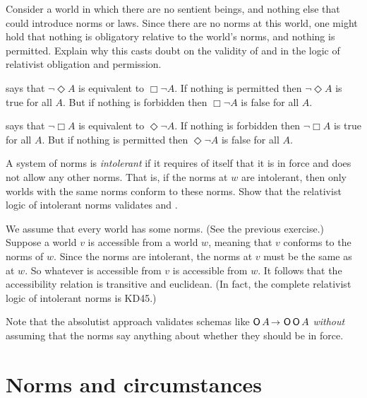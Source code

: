 \begin{exercise}
  Consider a world in which there are no sentient beings, and nothing else that
  could introduce norms or laws. Since there are no norms at this world, one
  might hold that nothing is obligatory relative to the world's norms, and
  nothing is permitted. Explain why this casts doubt on the validity of
   and  in the logic of relativist obligation and
  permission.
\end{exercise}
\begin{solution}
   says that $\neg \Diamond A$ is equivalent to $\Box \neg A$. If
  nothing is permitted then $\neg \Diamond A$ is true for all $A$. But if
  nothing is forbidden then $\Box \neg A$ is false for all $A$.

   says that $\neg \Box A$ is equivalent to $\Diamond \neg A$. If
  nothing is forbidden then $\neg \Box A$ is true for all $A$. But if
  nothing is permitted then $\Diamond \neg A$ is false for all $A$.

\end{solution}

\begin{exercise}
  A system of norms is \emph{intolerant} if it requires of itself that it is in
  force and does not allow any other norms. That is, if the norms at $w$ are
  intolerant, then only worlds with the same norms conform to these norms. Show
  that the relativist logic of intolerant norms validates  and .
\end{exercise}
\begin{solution}
  We assume that every world has some norms. (See the previous exercise.)
  Suppose a world $v$ is accessible from a world $w$, meaning that $v$ conforms
  to the norms of $w$. Since the norms are intolerant, the norms at $v$ must be
  the same as at $w$. So whatever is accessible from $v$ is accessible from $w$.
  It follows that the accessibility relation is transitive and euclidean. (In
  fact, the complete relativist logic of intolerant norms is KD45.)

  Note that the absolutist approach validates schemas like $\Ob A \to \Ob\Ob A$
  \emph{without} assuming that the norms say anything about whether they should
  be in force.
\end{solution}


\section{Norms and circumstances}\label{sec:oblig-circ}

